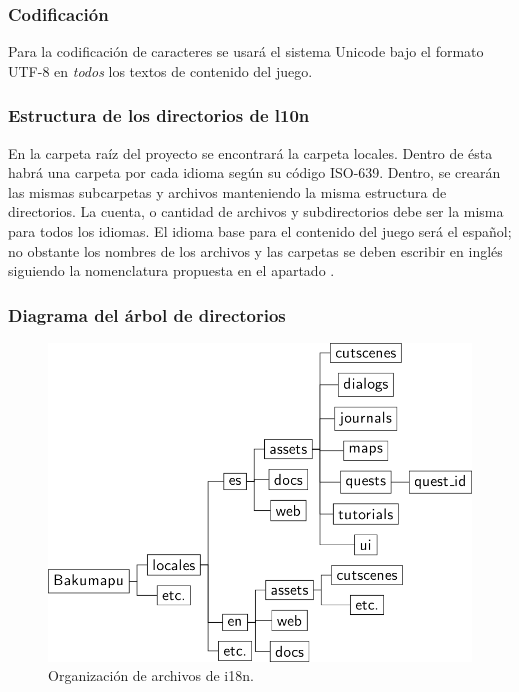 \subsubsection{Codificación}\label{i18n:codificacion}
Para la codificación de caracteres se usará el sistema Unicode bajo el formato UTF-8 en \emph{todos} los textos de contenido del juego.

\subsubsection{Estructura de los directorios de l10n}
En la carpeta raíz del proyecto se encontrará la carpeta locales. Dentro de ésta habrá una carpeta por cada idioma según su código ISO-639. Dentro, se crearán las mismas subcarpetas y archivos manteniendo la misma estructura de directorios. La cuenta, o cantidad de archivos y subdirectorios debe ser la misma para todos los idiomas. El idioma base para el contenido del juego será el español; no obstante los nombres de los archivos y las carpetas se deben escribir en inglés siguiendo la nomenclatura propuesta en el apartado .

\subsubsection{Diagrama del árbol de directorios}\label{i18n:arbol-de-directorios}

\begin{figure}[H]
	\centering
	\includegraphics[]{images/arbol_i18n}
	\caption{Organización de archivos de i18n.}
	\label{fig:arbolinternacionalizacion}
\end{figure}

